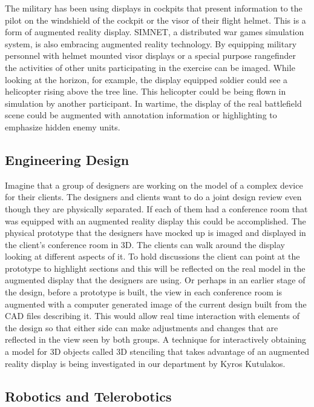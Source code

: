 The military has been using displays in cockpits that present information to the pilot on the windshield of the cockpit or the visor of their flight helmet. This is a form of augmented reality display. SIMNET, a distributed war games simulation system, is also embracing augmented reality technology. By equipping military personnel with helmet mounted visor displays or a special purpose rangefinder the activities of other units participating in the exercise can be imaged. While looking at the horizon, for example, the display equipped soldier could see a helicopter rising above the tree line. This helicopter could be being flown in simulation by another participant. In wartime, the display of the real battlefield scene could be augmented with annotation information or highlighting to emphasize hidden enemy units.

\subsection{Engineering Design}

Imagine that a group of designers are working on the model of a complex device for their clients. The designers and clients want to do a joint design review even though they are physically separated. If each of them had a conference room that was equipped with an augmented reality display this could be accomplished. The physical prototype that the designers have mocked up is imaged and displayed in the client's conference room in 3D. The clients can walk around the display looking at different aspects of it. To hold discussions the client can point at the prototype to highlight sections and this will be reflected on the real model in the augmented display that the designers are using. Or perhaps in an earlier stage of the design, before a prototype is built, the view in each conference room is augmented with a computer generated image of the current design built from the CAD files describing it. This would allow real time interaction with elements of the design so that either side can make adjustments and changes that are reflected in the view seen by both groups. A technique for interactively obtaining a model for 3D objects called 3D stenciling that takes advantage of an augmented reality display is being investigated in our department by Kyros Kutulakos.

\subsection{Robotics and Telerobotics}

